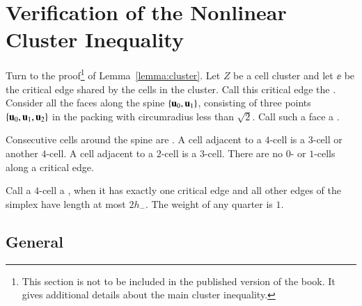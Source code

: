 \chapter{Verification of the Nonlinear Cluster Inequality}

Turn to the proof\footnote{This section is not to be included
in the published version of the book.  It gives additional details about the
main cluster inequality.} of Lemma~\ref{lemma:cluster}.  Let $Z$ be a cell
cluster and let $\ee$ be the critical edge shared by the cells in the
cluster.  Call this critical edge the .  Consider all
the faces along the spine $\{ {\mathbf u}_0, {\mathbf u}_1\}$, consisting of three
points $\{ {\mathbf u}_0, {\mathbf u}_1, {\mathbf u}_2\}$ in the packing with circumradius less
than $\sqrt2$.  Call such a face a . 

Consecutive cells around the spine are .  A cell
adjacent to a $4$-cell is a $3$-cell or another $4$-cell.  A cell
adjacent to a $2$-cell is a $3$-cell.  There are no $0$- or $1$-cells
along a critical edge.   %

Call a $4$-cell a , when it has exactly one critical
edge and all other edges of the simplex have length at most $2 h_-$.
The weight of any quarter is $1$.

\section{General}

%


